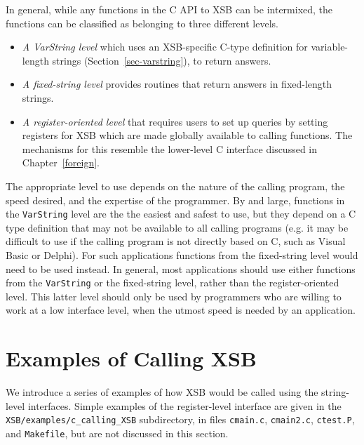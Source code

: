 In general, while any functions in the C API to XSB can be intermixed,
the functions can be classified as belonging to three different
levels.
%
\begin{itemize}
\item {\em A VarString level} which uses an XSB-specific C-type
  definition for variable-length strings
  (Section~\ref{sec-varstring}), to return answers.
%
\item {\em A fixed-string level} provides routines that return answers
  in fixed-length strings.
%
\item {\em A register-oriented level} that requires users to set up
  queries by setting registers for XSB which are made globally
  available to calling functions.  The mechanisms for this resemble
  the lower-level C interface discussed in Chapter~\ref{foreign}.

\end{itemize}
%
The appropriate level to use depends on the nature of the calling
program, the speed desired, and the expertise of the programmer.  By
and large, functions in the {\tt VarString} level are the the easiest
and safest to use, but they depend on a C type definition that may not
be available to all calling programs (e.g. it may be difficult to use
if the calling program is not directly based on C, such as Visual
Basic or Delphi).  For such applications functions from the
fixed-string level would need to be used instead.  In general, most
applications should use either functions from the {\tt VarString} or
the fixed-string level, rather than the register-oriented level.  This
latter level should only be used by programmers who are willing to
work at a low interface level, when the utmost speed is needed by an
application.


\section{Examples of Calling XSB}

We introduce a series of examples of how XSB would be called using the
string-level interfaces.  Simple examples of the register-level
interface are given in the {\tt XSB/examples/c\_calling\_XSB}
subdirectory, in files {\tt cmain.c}, {\tt cmain2.c}, {\tt ctest.P},
and {\tt Makefile}, but are not discussed in this section.

